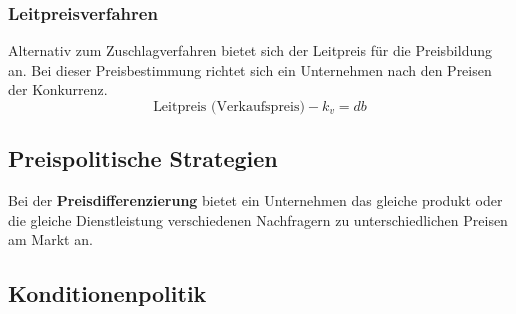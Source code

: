 \documentclass[12pt]{article}
\begin{document}
\subsubsection{Leitpreisverfahren}
Alternativ zum Zuschlagverfahren bietet sich der Leitpreis für die Preisbildung an. Bei dieser Preisbestimmung richtet sich ein Unternehmen nach den Preisen der Konkurrenz.
\begin{equation}
    \text{Leitpreis (Verkaufspreis)} - k_v = db
\end{equation}

\subsection{Preispolitische Strategien}
\begin{Definitionsbox}
    Bei der \textbf{Preisdifferenzierung} bietet ein Unternehmen das gleiche produkt oder die gleiche Dienstleistung verschiedenen Nachfragern zu unterschiedlichen Preisen am Markt an.
\end{Definitionsbox}

\subsection{Konditionenpolitik}
\end{document}
